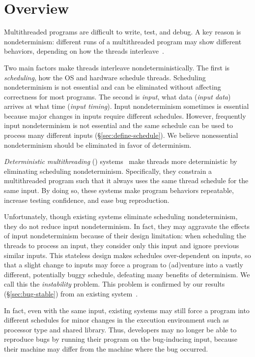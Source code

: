 \section{Overview} \label{sec:tern-overview}

Multithreaded programs are difficult to write, test, and debug.  A key
reason is nondeterminism: different runs of a multithreaded
program may show different behaviors, depending on how the threads
interleave~\cite{lee06}.

Two main factors make threads interleave nondeterministically.  The first
is \emph{scheduling}, how the OS and hardware schedule threads.
Scheduling nondeterminism is not essential and can be eliminated without
affecting correctness for most programs.  The second is \emph{input}, what
data (\emph{input data}) arrives at what time (\emph{input timing}).
Input nondeterminism sometimes is essential because major changes in
inputs require different schedules.  However, frequently input
nondeterminism is not essential and the same schedule can be used to
process many different inputs (\S\ref{sec:define-schedule}).  We believe
nonessential nondeterminism should be eliminated in favor of determinism.

\emph{Deterministic multithreading} (\dmt)
systems~\cite{dmp:asplos09,coredet:asplos10,kendo:asplos09} make threads
more deterministic by eliminating scheduling nondeterminism.
Specifically, they constrain a multithreaded program such that it always
uses the same thread schedule for the same input.  By doing so, these
systems make program behaviors repeatable, increase testing confidence,
and ease bug reproduction.

Unfortunately, though existing \dmt systems eliminate scheduling
nondeterminism, they do not reduce input nondeterminism.  In fact, they
may aggravate the effects of input nondeterminism because of their design
limitation: when scheduling the threads to process an input, they consider
only this input and ignore previous similar inputs.  This stateless design
makes schedules over-dependent on inputs, so that a slight change to
inputs may force a program to (ad)venture into a vastly different,
potentially buggy schedule, defeating many benefits of determinism.  We
call this the \emph{instability} problem. 
This problem is confirmed by our results (\S\ref{sec:bug-stable}) from
an existing \dmt system~\cite{coredet:asplos10}.

In fact, even with the same input, existing \dmt systems may still force a
program into different schedules for minor changes in the execution
environment such as processor type and shared library.  Thus,
developers may no longer be able to reproduce bugs by running their
program on the bug-inducing input, because their machine may differ from
the machine where the bug occurred.

